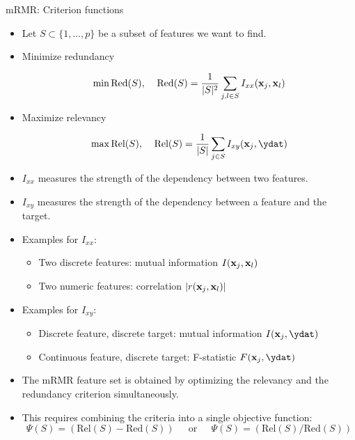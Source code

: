 \begin{vbframe}{\MakeLowercase{M}RMR: Criterion functions}
\begin{itemize}
\item Let $S \subset \{1, \dots, p \}$ be a subset of features we want to find.
\item Minimize redundancy

 $$\min \text{Red}(S), \;\;\;\; \text{Red}(S) = \frac{1}{|S|^2} \sum_{j, l \in S} I_{xx}(\mathbf{x}_j, \mathbf{x}_l)$$

\item Maximize relevancy

 $$\max \text{Rel}(S), \;\;\;\; \text{Rel}(S) = \frac{1}{|S|} \sum_{j \in S} I_{xy}(\xj, \ydat)$$

\item $I_{xx}$ measures the strength of the dependency between two features.
\item $I_{xy}$ measures the strength of the dependency between a feature and the target.
\end{itemize}

\framebreak

\begin{itemize}

\lz

\item Examples for $I_{xx}$:
  \begin{itemize}
  \item Two discrete features: mutual information $I(\mathbf{x}_j, \mathbf{x}_l)$
  \item Two numeric features: correlation $|r(\mathbf{x}_j, \mathbf{x}_l)|$
  \end{itemize}

\lz

\item Examples for $I_{xy}$:
  \begin{itemize}
  \item Discrete feature, discrete target: mutual information $I(\xj, \ydat)$
  \item Continuous feature, discrete target: F-statistic $F(\xj, \ydat)$
  \end{itemize}
\end{itemize}


\framebreak

\begin{itemize}
\item The mRMR feature set is obtained by optimizing the relevancy and the redundancy criterion simultaneously.
\item This requires combining the criteria into a single objective function:
$$\Psi(S) = (\text{Rel}(S) - \text{Red}(S)) \;\;\;\; \text{ or } \;\;\;\; \Psi(S) = (\text{Rel}(S)/\text{Red}(S))$$


\end{itemize}
\end{vbframe}
